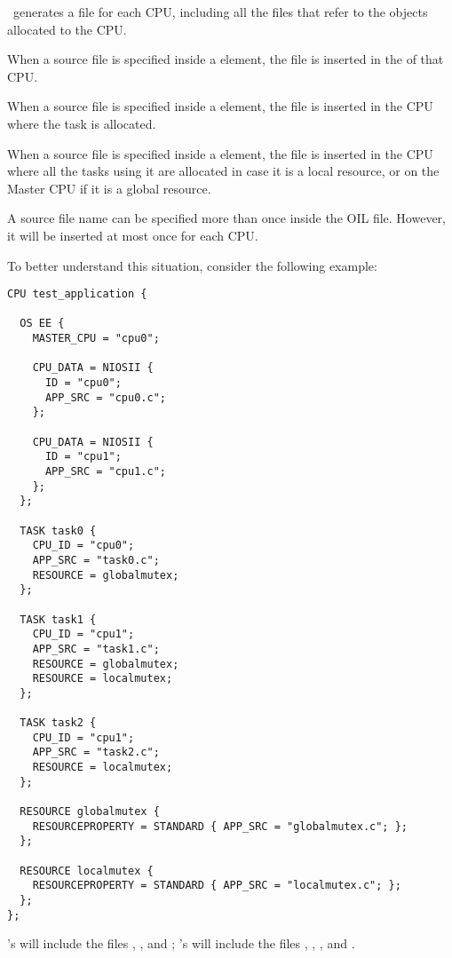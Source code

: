 \rtd\ generates a  file for each CPU, including all
the files that refer to the objects allocated to the CPU.

When a source file is specified inside a  element, the
file is inserted in the  of that CPU.

When a source file is specified inside a  element, the
file is inserted in the CPU where the task is allocated.

When a source file is specified inside a  element, the
file is inserted in the CPU where all the tasks using it are allocated
in case it is a local resource, or on the Master CPU if it is a global
resource.

A source file name can be specified more than once inside the OIL
file. However, it will be inserted at most once for each CPU.

To better understand this situation, consider the following example:

\begin{lstlisting}
CPU test_application {

  OS EE {
    MASTER_CPU = "cpu0";			

    CPU_DATA = NIOSII {
      ID = "cpu0";
      APP_SRC = "cpu0.c";
    };

    CPU_DATA = NIOSII {
      ID = "cpu1";
      APP_SRC = "cpu1.c";
    };
  };

  TASK task0 {
    CPU_ID = "cpu0";
    APP_SRC = "task0.c";
    RESOURCE = globalmutex;
  };

  TASK task1 {
    CPU_ID = "cpu1";
    APP_SRC = "task1.c";
    RESOURCE = globalmutex;
    RESOURCE = localmutex;
  };

  TASK task2 {
    CPU_ID = "cpu1";
    APP_SRC = "task2.c";
    RESOURCE = localmutex;
  };
  
  RESOURCE globalmutex {
    RESOURCEPROPERTY = STANDARD { APP_SRC = "globalmutex.c"; };
  };

  RESOURCE localmutex {
    RESOURCEPROPERTY = STANDARD { APP_SRC = "localmutex.c"; };
  };
};
\end{lstlisting}

's  will include the files
, , and ;
's  will include the files ,
, , and .



